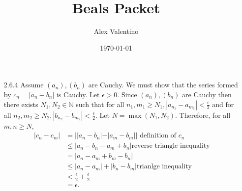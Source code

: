\documentclass[12pt, letterpaper]{article}
\date{\today}
\author{Alex Valentino}
\title{Beals Packet}
\newcommand{\N}{\mathbb{N}}
\begin{document}
\begin{enumerate}
	\item[2.6.4] Assume $(a_n),(b_n)$ are Cauchy.  We must show that the series
	formed by $c_n = |a_n - b_n|$ is Cauchy.  Let $\epsilon > 0$.  Since $(a_n),(b_n)$ are Cauchy then there exists $N_1, N_2 \in \N$ such that for all 
	$n_1,m_1 \geq N_1, |a_{n_1} - a_{m_1}| < \frac{\epsilon}{2}$ and for all 
	$n_2,m_2 \geq N_2, |b_{n_2} - b_{m_2}| < \frac{\epsilon}{2}$.  
	Let $N = \max(N_1, N_2)$.  Therefore, for all $m,n \geq N$,
	\begin{align*}
		|c_n - c_m| &= ||a_n - b_n| - |a_m - b_m||\text{ definition of $c_n$}\\
		&\leq |a_n - b_n - a_m + b_n|\text{reverse triangle inequality}\\
		&= |a_n - a_m + b_m - b_n|\\
		&\leq |a_n - a_m| + |b_n - b_m| \text{trianlge inequality}\\
		&< \frac{\epsilon}{2} + \frac{\epsilon}{2}\\
		&= \epsilon.
	\end{align*}
\end{enumerate}
\end{document}
